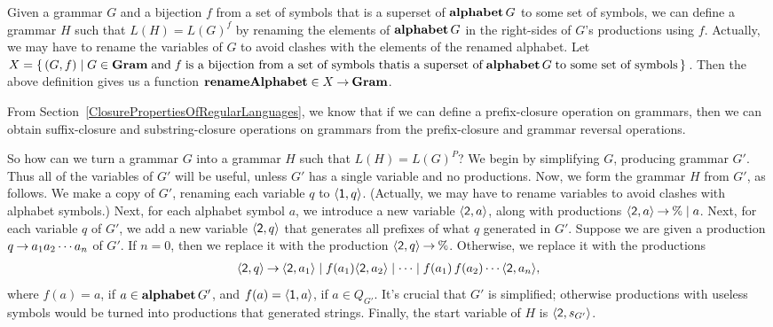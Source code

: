 Given a grammar $G$ and a bijection $f$ from a set of symbols that is
a superset of $\mathbf{alphabet}\,G$ to some set of symbols, we can define a
grammar $H$ such that $L(H)=L(G)^f$ by renaming the elements of
%
%
$\mathbf{alphabet}\,G$ in the right-sides of $G$'s productions using $f$.
Actually, we may have to rename the variables of $G$ to avoid clashes
with the elements of the renamed alphabet.  Let
$X=\{ \, (G,f) \mid G\in\mathbf{Gram}\;\allowbreak\mbox{and}\allowbreak\;f\;\allowbreak\mbox{is a bijection from a
    set of symbols that}\allowbreak\allowbreak\mbox{is a superset
    of}\allowbreak\;\mathbf{alphabet}\,G\;\allowbreak\mbox{to some set of symbols}\allowbreak \, \}$.  Then the above
definition gives us a function
$\mathbf{renameAlphabet}\in X\mathbin{\to}\mathbf{Gram}$.
%

From Section~\ref{ClosurePropertiesOfRegularLanguages},
we know that if we can define a prefix-closure operation
%
%
%
%
%
%
on grammars, then we can obtain suffix-closure and substring-closure
operations on grammars from the prefix-closure and grammar reversal
operations.

So how can we turn a grammar $G$ into a grammar $H$ such that
$L(H)=L(G)^P$?
We begin by simplifying $G$, producing grammar $G'$.
Thus all of the variables of $G'$ will be useful, unless $G'$ has
a single variable and no productions.  Now, we form the grammar $H$
from $G'$, as follows.
We make a copy of $G'$, renaming each variable $q$ to
$\langle\mathsf{1},q\rangle$.  (Actually, we may have to rename variables
to avoid clashes with alphabet symbols.)
Next, for each alphabet symbol $a$, we introduce a new variable
$\langle\mathsf{2},a\rangle$, along with productions
$\langle\mathsf{2},a\rangle\mathbin{\to}\%\mid a$.
Next, for each variable $q$ of $G'$, we add a new variable
$\langle\mathsf{2},q\rangle$ that generates all prefixes of what $q$
generated in $G'$.  Suppose we are given a production $q\mathbin{\to}
a_1a_2\cdots a_n$ of $G'$.  If $n=0$, then we replace it with the
production $\langle\mathsf{2},q\rangle\mathbin{\to}\%$.  Otherwise, we replace it
with the productions
\begin{gather*}
\langle\mathsf{2},q\rangle\mathbin{\to}
\langle\mathsf{2},a_1\rangle \mid
f(a_1)\langle\mathsf{2},a_2\rangle \mid \cdots \mid
f(a_1)\,f(a_2)\cdots\langle\mathsf{2},a_n\rangle ,
\end{gather*}
where $f(a) = a$, if $a\in\mathbf{alphabet}\,G'$, and
$f(a)=\langle\mathsf{1},a\rangle$, if $a\in Q_{G'}$.  It's crucial that
$G'$ is simplified; otherwise productions with useless symbols would
be turned into productions that generated strings. Finally, the start
variable of $H$ is $\langle\mathsf{2},s_{G'}\rangle$.

